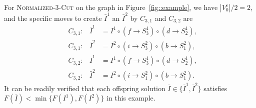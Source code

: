 \documentclass[12pt, a4paper]{article}%
\numberwithin{equation}{section}
\theoremstyle{plain}
\begin{document}
For 	\textsc{Normalized}-$3$-\textsc{Cut} on the graph in Figure~\ref{fig::example}, we have $|{V}_0^c|/2=2$, and the specific moves to create $\bar{I}^1$ an $\bar{I}^2$ by $C_{3,1}$ and $C_{3,2}$ are
$$
\begin{aligned}
	&C_{3,1}:&\bar{I}^1&=I^1\circ (f\rightarrow S_3^1) \circ (d\rightarrow S_2^1),\\
	&C_{3,1}:&\bar{I}^2&=I^2\circ (i\rightarrow S_3^2) \circ (b\rightarrow S_1^2),\\
	&C_{3,2}:&\bar{I}^1&=I^1\circ (f\rightarrow S_3^1) \circ (d\rightarrow S_2^1),\\
	&C_{3,2}:&\bar{I}^2&=I^2\circ (i\rightarrow S_1^2) \circ (b\rightarrow S_1^2).
\end{aligned}
$$
It can be readily verified that each offspring solution $\bar{I}\in\{\bar{I}^1,\bar{I}^2\}$ satisfies $F(\bar{I})<\min\{F(I^1),F(I^2)\}$ in this example.
\end{document}
